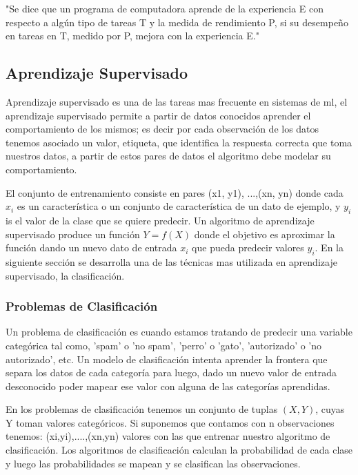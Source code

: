 "Se dice que un programa de computadora aprende de la experiencia E con respecto a algún tipo de tareas T y la medida de rendimiento P, si su desempeño en tareas en T, medido por P, mejora con la experiencia E." \citep{Mitchell}

\subsection{Aprendizaje Supervisado}\label{sub:aprendizaje_supervisado}

Aprendizaje supervisado es una de las tareas mas frecuente en sistemas de \ac{ml}, el aprendizaje supervisado permite a partir de datos conocidos aprender el comportamiento de los mismos; es decir por cada observación de los datos tenemos asociado un valor, etiqueta, que identifica la respuesta correcta que toma nuestros datos, a partir de estos pares de datos el algoritmo debe modelar su comportamiento. 

El conjunto de entrenamiento consiste en pares (x1, y1), ...,(xn, yn) donde cada $x_i$  es un característica o un conjunto de característica de un dato de ejemplo, y $y_i$ is el valor de la clase que se quiere predecir. Un algoritmo de aprendizaje supervisado produce un función $Y = f(X)$ donde el objetivo es aproximar la función dando un nuevo dato de entrada $x_i$ que pueda predecir valores $y_i$. En la siguiente sección se desarrolla una de las técnicas mas utilizada en aprendizaje supervisado, la clasificación.


\subsubsection{Problemas de Clasificación}

Un problema de clasificación es cuando estamos tratando de predecir una variable categórica tal como, 'spam' o 'no spam', 'perro' o 'gato', 'autorizado' o 'no autorizado', etc. Un modelo de clasificación intenta aprender la frontera que separa los datos de cada categoría para luego, dado un nuevo valor de entrada desconocido poder mapear ese valor con alguna de las categorías aprendidas.

En los problemas de clasificación tenemos un conjunto de tuplas $(X,Y)$, cuyas Y toman valores categóricos. Si suponemos que contamos con n observaciones tenemos: (xi,yi),....,(xn,yn) valores con las que entrenar nuestro algoritmo de clasificación. Los algoritmos de clasificación  calculan la probabilidad de cada clase y luego las probabilidades se mapean y se clasifican las observaciones.

